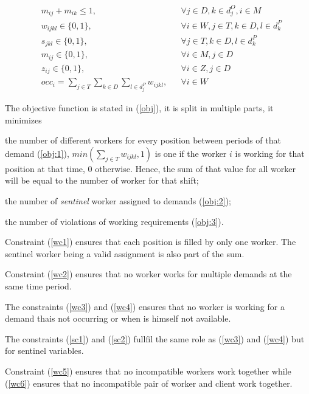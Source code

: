 \documentclass[../../thesis.tex]{subfiles}
\begin{document}
\begin{align}
    & m_{ij} + m_{ik} \leq 1, && \forall j \in D, k \in d^O_j, i \in M  \label{mc3} \\
    & w_{ijkl} \in \{0, 1\}, && \forall i \in W, j \in T, k \in D, l \in d^P_k \label{binary1} \\
    & s_{jkl} \in \{0, 1\}, && \forall j \in T, k \in D, l \in d^P_k \label{binary2} \\
    & m_{ij} \in \{0, 1\}, && \forall i \in M, j \in D \label{binary3} \\ 
    & z_{ij} \in \{0, 1\}, && \forall i \in Z, j \in D \label{binary4} \\ 
    & occ_i = \sum_{j \in T} \sum_{k \in D} \sum_{l \in d^P_j} w_{ijkl}, && \forall i \in W \label{occ}
\end{align}
\endgroup

    
The objective function is stated in (\ref{obj}), it is split in multiple parts, it minimizes 
\begin{enumerate*}[label=(\roman*)]
  \item the number of different workers for every position between periods of that demand (\ref{obj:1}), $min(\sum_{j \in T} w_{ijkl}, 1)$ is one if the worker $i$ is working for that position at that time, 0 otherwise. Hence, the sum of that value for all worker will be equal to the number of worker for that shift;
  \item the number of \emph{sentinel} worker assigned to demands (\ref{obj:2});
  \item the number of violations of working requirements (\ref{obj:3}).
\end{enumerate*}




Constraint (\ref{wc1}) ensures that each position is filled by only one worker. The sentinel worker being a valid assignment is also part of the sum.

Constraint (\ref{wc2}) ensures that no worker works for multiple demands at the same time period. 

The constraints (\ref{wc3}) and (\ref{wc4}) ensures that no worker is working for a demand thais not occurring or when is himself not available. 

The constraints (\ref{sc1}) and (\ref{sc2}) fullfil the same role as (\ref{wc3}) and (\ref{wc4}) but for sentinel variables. 



Constraint (\ref{wc5}) ensures that no incompatible workers work together while (\ref{wc6}) ensures that no incompatible pair of worker and client work together. 
\end{document}
